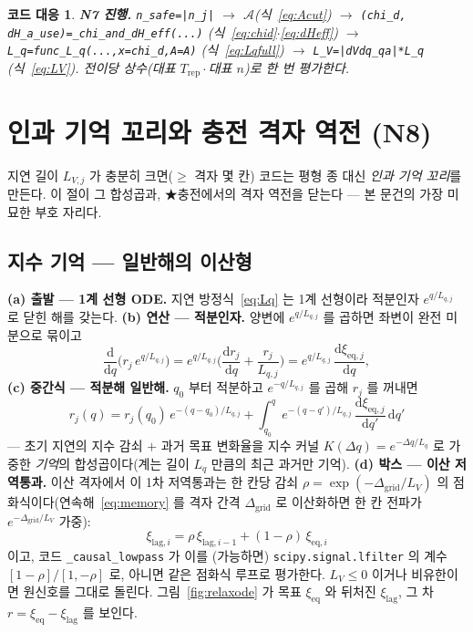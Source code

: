 \documentclass[11pt,a4paper]{article}
\newtheorem*{codebox}{코드 대응}
\newcommand{\dd}{\mathrm{d}}
\newcommand{\eq}{\mathrm{eq}}
\newcommand{\rep}{\mathrm{rep}}
\newcommand{\code}[1]{\texttt{#1}}
\begin{document}
\begin{codebox}
\textbf{N7 진행.} \code{n\_safe=|n\_j|} $\to$ $\mathcal A$(식~\eqref{eq:Acut}) $\to$
\code{(chi\_d, dH\_a\_use)=\_chi\_and\_dH\_eff(...)} (식~\eqref{eq:chid}$\cdot$\eqref{eq:dHeff}) $\to$
\code{L\_q=func\_L\_q(...,x=chi\_d,A=A)} (식~\eqref{eq:Lqfull}) $\to$ \code{L\_V=|dVdq\_qa|*L\_q} (식~\eqref{eq:LV}).
전이당 \emph{상수}(대표 $T_\rep\cdot$대표 $n$)로 한 번 평가한다.
\end{codebox}

\section{인과 기억 꼬리와 충전 격자 역전 (N8)}\label{sec:tail}
지연 길이 $L_{V,j}$ 가 충분히 크면($\ge$ 격자 몇 칸) 코드는 평형 종 대신 \emph{인과 기억 꼬리}를 만든다. 이 절이 그
합성곱과, ★충전에서의 격자 역전을 닫는다 — 본 문건의 가장 미묘한 부호 자리다.

\subsection{지수 기억 — 일반해의 이산형}
\textbf{(a) 출발 — 1계 선형 ODE.} 지연 방정식~\eqref{eq:Lq} 는 1계 선형이라 적분인자 $e^{q/L_{q,j}}$ 로 닫힌 해를 갖는다.
\textbf{(b) 연산 — 적분인자.} 양변에 $e^{q/L_{q,j}}$ 를 곱하면 좌변이 완전 미분으로 묶이고
\begin{equation}
\frac{\dd}{\dd q}\Big(r_j\,e^{q/L_{q,j}}\Big)
=e^{q/L_{q,j}}\Big(\frac{\dd r_j}{\dd q}+\frac{r_j}{L_{q,j}}\Big)
=e^{q/L_{q,j}}\,\frac{\dd\xi_{\eq,j}}{\dd q},
\label{eq:intfactor}
\end{equation}
\textbf{(c) 중간식 — 적분해 일반해.} $q_0$ 부터 적분하고 $e^{-q/L_{q,j}}$ 를 곱해 $r_j$ 를 꺼내면
\begin{equation}
r_j(q)=r_j(q_0)\,e^{-(q-q_0)/L_{q,j}}
+\int_{q_0}^{q}e^{-(q-q')/L_{q,j}}\,\frac{\dd\xi_{\eq,j}}{\dd q'}\,\dd q'
\label{eq:memory}
\end{equation}
— 초기 지연의 지수 감쇠 $+$ 과거 목표 변화율을 지수 커널 $K(\Delta q)=e^{-\Delta q/L_q}$ 로 가중한 \emph{기억}의
합성곱이다(계는 길이 $L_q$ 만큼의 최근 과거만 기억). \textbf{(d) 박스 — 이산 저역통과.} 이산 격자에서 이 1차 저역통과는
한 칸당 감쇠 $\rho=\exp(-\Delta_\mathrm{grid}/L_V)$ 의 점화식이다(연속해~\eqref{eq:memory} 를 격자 간격 $\Delta_\mathrm{grid}$
로 이산화하면 한 칸 전파가 $e^{-\Delta_\mathrm{grid}/L_V}$ 가중):
\begin{equation}
\xi_{\mathrm{lag},i}=\rho\,\xi_{\mathrm{lag},i-1}+(1-\rho)\,\xi_{\eq,i}
\label{eq:lowpass}
\end{equation}
이고, 코드 \code{\_causal\_lowpass} 가 이를 (가능하면) \code{scipy.signal.lfilter} 의 계수
$[1-\rho]/[1,-\rho]$ 로, 아니면 같은 점화식 루프로 평가한다. $L_V\le0$ 이거나 비유한이면 원신호를 그대로 돌린다.
그림~\ref{fig:relaxode} 가 목표 $\xi_\eq$ 와 뒤처진 $\xi_\mathrm{lag}$, 그 차 $r=\xi_\eq-\xi_\mathrm{lag}$ 를 보인다.
\end{document}
